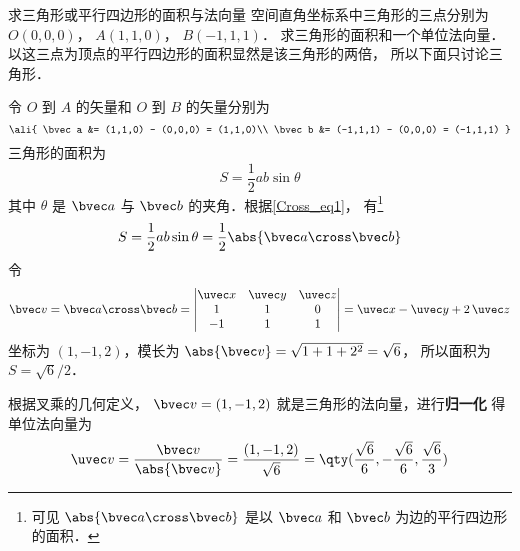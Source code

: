 \begin{example}{求三角形或平行四边形的面积与法向量}\label{Cross_ex1}
空间直角坐标系中三角形的三点分别为 $O(0,0,0)$，  $A(1,1,0)$，  $B(-1,1,1)$． 求三角形的面积和一个单位法向量． 以这三点为顶点的平行四边形的面积显然是该三角形的两倍， 所以下面只讨论三角形．

令 $O$ 到 $A$ 的矢量和  $O$ 到 $B$ 的矢量分别为
\begin{equation}
\ali{
\bvec a  &= (1,1,0) - (0,0,0) = (1,1,0)\\
\bvec b  &= (-1,1,1) - (0,0,0) = (-1,1,1)
}\end{equation}
三角形的面积为
 \begin{equation}
S = \frac12 ab \sin \theta 
\end{equation}
其中 $\theta $ 是 $\bvec a$ 与 $\bvec b$ 的夹角．根据\autoref{Cross_eq1}， 有\footnote{可见 $\abs{\bvec a\cross\bvec b}$ 是以 $\bvec a$ 和 $\bvec b$ 为边的平行四边形的面积．}
\begin{equation}
S = \frac12 ab \sin \theta  = \frac12 \abs{\bvec a\cross\bvec b}
\end{equation}
令
\begin{equation}
\bvec v = \bvec a \cross \bvec b = 
\begin{vmatrix} \uvec x & \uvec y & \uvec z \\ 1&1&0\\-1&1&1 \end{vmatrix}
= \uvec x - \uvec y + 2\,\uvec z 
\end{equation}
坐标为 $(1,-1,2)$，模长为 $\abs{\bvec v} = \sqrt{1 + 1 + 2^2} = \sqrt 6$， 所以面积为 $S = \sqrt 6 /2$． 

根据叉乘的几何定义， $\bvec v = (1,-1,2)$ 就是三角形的法向量，进行\textbf{归一化}
得单位法向量为
 \begin{equation}
\uvec v = \frac{\bvec v}{\abs{\bvec v}} = \frac{(1,-1,2)}{\sqrt 6} = \qty( \frac{\sqrt 6 }{6}, - \frac{\sqrt 6 }{6}, \frac{\sqrt 6 }{3} )
\end{equation}
\end{example}

